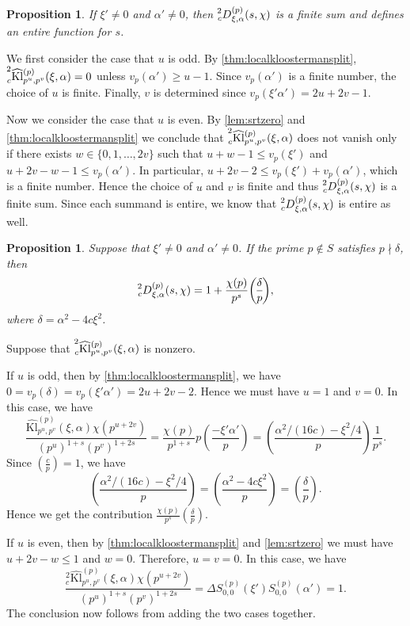 \documentclass[10pt,oneside,reqno]{amsart}
\makeatletter
\newcommand\Kl{\mathrm{Kl}}
\renewcommand\leq{\leqslant}
\renewcommand\geq{\geqslant}
\newcommand\legendresymbol[2]{\genfrac{(}{)}{}{}{#1}{#2}}
\theoremstyle{THEOREM}
\newtheorem{proposition}[theorem]{Proposition}
\theoremstyle{DEFINITION}
\theoremstyle{EXERCISE}
\numberwithin{equation}{section}
\renewenvironment{proof}[1][\proofname]{\par
  \vspace{-6pt}
  \pushQED{\qed}
  \normalfont \topsep6\p@\@plus6\p@\relax
  \trivlist
  \item[\hskip\labelsep\rmfamily\bfseries
    #1\@addpunct{:}]\ignorespaces
}{
  \popQED\endtrivlist\@endpefalse
  \vspace{-6pt}
}
\makeatother
\begin{document}
\begin{proposition}\label{prop:finitesumsplit}
If $\xi'\neq 0$ and $\alpha'\neq 0$, then $\prescript{2}{c}D_{\xi,\alpha}^{(p)}(s,\chi)$ is a finite sum and defines an entire function for $s$.
\end{proposition}
\begin{proof}
We first consider the case that $u$ is odd. By \autoref{thm:localkloostermansplit}, $\prescript{2}{c}{\widehat{\Kl}}_{p^u,p^v}^{(p)}(\xi,\alpha)=0$ unless $v_p(\alpha')\geq u-1$. Since $v_p(\alpha')$ is a finite number, the choice of $u$ is finite. Finally, $v$ is determined  since $v_p(\xi'\alpha')=2u+2v-1$. 

Now we consider the case that $u$ is even. By \autoref{lem:srtzero} and \autoref{thm:localkloostermansplit} we conclude that $\prescript{2}{c}{\widehat{\Kl}}_{p^u,p^v}^{(p)}(\xi,\alpha)$ does not vanish only if there exists $w\in\{0,1,\dots,2v\}$ such that $u+w-1\leq v_p(\xi')$ and $u+2v-w-1\leq v_p(\alpha')$. In particular, $u+2v-2\leq v_p(\xi')+v_p(\alpha')$, which is a finite number. Hence the choice of $u$ and $v$ is finite and thus $\prescript{2}{c}D_{\xi,\alpha}^{(p)}(s,\chi)$ is a finite sum. Since each summand is entire, we know that $\prescript{2}{c}D_{\xi,\alpha}^{(p)}(s,\chi)$ is entire as well.
\end{proof}

\begin{proposition}\label{prop:bothnonzerosplit}
Suppose that $\xi'\neq 0$ and $\alpha'\neq 0$. If the prime $p\notin S$ satisfies $p\nmid\delta$, then
\[
\prescript{2}{c}D_{\xi,\alpha}^{(p)}(s,\chi)=1+\frac{\chi(p)}{p^{s}}\legendresymbol{\delta}{p},
\]
where $\delta=\alpha^2-4c \xi^2$.
\end{proposition}
\begin{proof}
Suppose that $\prescript{2}{c}{\widehat{\Kl}}_{p^u,p^v}^{(p)}(\xi,\alpha)$ is nonzero. 

If $u$ is odd, then by \autoref{thm:localkloostermansplit}, we have $0=v_p(\delta)=v_p(\xi'\alpha')=2u+2v-2$. Hence we must have $u=1$ and $v=0$. In this case, we have
\[
\frac{\widehat{\Kl}_{p^u,p^v}^{(p)}(\xi,\alpha)\chi(p^{u+2v})}{(p^{u})^{1+s}(p^{v}) ^{1+2s}}=\frac{\chi(p)}{p^{1+s}}p\legendresymbol{-\xi'\alpha'}{p}=\legendresymbol{\alpha^2/(16c)-\xi^2/4}{p}\frac{1}{p^s}.
\]
Since $\legendresymbol{c}{p}=1$, we have
\[
\legendresymbol{\alpha^2/(16c)-\xi^2/4}{p}=\legendresymbol{\alpha^2-4c\xi^2}{p}= \legendresymbol{\delta}{p}.
\]
Hence we get the contribution $\frac{\chi(p)}{p^{s}}\legendresymbol{\delta}{p}$.

If $u$ is even, then by \autoref{thm:localkloostermansplit} and \autoref{lem:srtzero} we must have $u+2v-w\leq 1$ and $w=0$. Therefore, $u=v=0$. In this case, we have
\[
\frac{{}_c^2\widehat{\Kl}_{p^u,p^v}^{(p)}(\xi,\alpha)\chi(p^{u+2v})}{(p^{u})^{1+s}(p^{v}) ^{1+2s}}=\Delta S_{0,0}^{(p)}(\xi')S_{0,0}^{(p)}(\alpha')=1.
\]
The conclusion now follows from adding the two cases together.
\end{proof}
\end{document}
